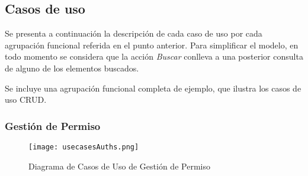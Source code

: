 \subsection{\forlnameref Casos de uso}
\label{sec:useCases}

Se presenta a continuación la descripción de cada caso de uso por cada agrupación funcional referida en el punto anterior. Para simplificar el modelo, en todo momento se considera que la acción \textit{Buscar} conlleva a una posterior consulta de alguno de los elementos buscados.

\begin{shaded}
Se incluye una agrupación funcional completa de ejemplo, que ilustra los casos de uso \ac{CRUD}.
\end{shaded}

\subsubsection*{Gestión de Permiso}

\begin{figure}[H]
\centering
\texttt{[image: usecasesAuths.png]}
\caption{Diagrama de Casos de Uso de Gestión de Permiso}
\label{fig:usecasesAuths}
\end{figure}



